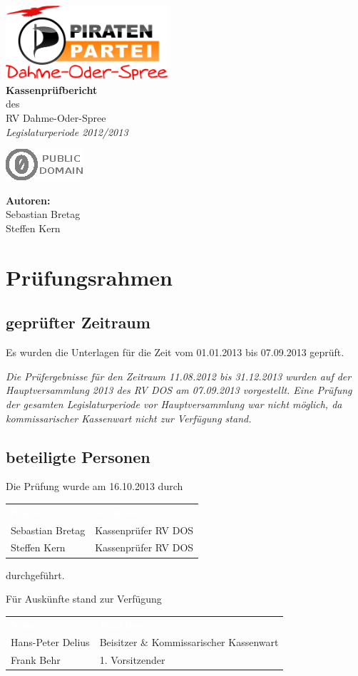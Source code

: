 \documentclass[%
	titlepage,oneside,12pt,headlines=1.5,numbers=noenddot, chapterprefix=false,parskip=full-,DIV=14,pagesize]{scrreprt}
\makeatletter
\newcommand*\@lizenz{
		\includegraphics[scale=2.5]{./pd.eps}
	}
\renewcommand\maketitle{
	\begingroup
		\begin{titlepage}
			\begin{center}
					\includegraphics[width=6cm]{DOS-Logo.png}\\[4cm]
				{\bfseries
					\makeatletter
						\Huge Kassenprüfbericht
					\makeatother
				}\\[5mm]
				\makeatletter
					{\Large des}\\[5mm]
					{\Large RV Dahme-Oder-Spree}\\[50mm]
					\textit{\Large Legislaturperiode 2012/2013 }
				\makeatother
					
			\end{center}
    		\vspace*{\fill} 
    		\begin{minipage}[b]{8cm}
    		\begin{flushleft}
    			\makeatletter
    				\@lizenz
    			\makeatother
    		\end{flushleft}
    	\end{minipage}
    		\hfill
    		\begin{minipage}[b]{8cm} 
    			\begin{flushright}
    				\textbf{Autoren:}\\[2mm]
    				Sebastian Bretag\\
    				Steffen Kern
    			\end{flushright}
    		\end{minipage}
    	\end{titlepage}
	\endgroup
	\pagebreak
	\pagestyle{plain}
	\onehalfspacing 
	\pagenumbering{arabic}
	\setcounter{page}{1}
	\tableofcontents
	\pagebreak
}
\renewcommand{\arraystretch}{1.2}%
\makeatother
\begin{document}
 
\maketitle

\chapter{Prüfungsrahmen}
\section{geprüfter Zeitraum}
Es wurden die Unterlagen für die Zeit vom 01.01.2013 bis 07.09.2013 geprüft.

\textit{Die Prüfergebnisse für den Zeitraum 11.08.2012 bis 31.12.2013 wurden auf der Hauptversammlung 2013 des RV DOS am 07.09.2013 vorgestellt. Eine Prüfung der gesamten Legislaturperiode vor Hauptversammlung war nicht möglich, da kommissarischer Kassenwart nicht zur Verfügung stand.}
\section{beteiligte Personen}
Die Prüfung wurde am 16.10.2013 durch
\renewcommand{\arraystretch}{1.2}%
\setlength{\arrayrulewidth}{1.5pt}%
%
\begin{longtable}[ht]{|p{} p{}|}
\hline\rowcolor{pirateorange} 
	\textcolor{white}{\textbf{Name}} & \textcolor{white}{\textbf{Funktion}}  \\
        Sebastian Bretag & Kassenprüfer RV DOS \\ 
        Steffen Kern  & Kassenprüfer RV DOS  \\
\hline
\end{longtable}\vspace{-1.25em}
durchgeführt.

Für Auskünfte stand zur Verfügung
\renewcommand{\arraystretch}{1.2}%
\setlength{\arrayrulewidth}{1.5pt}%
%
\begin{longtable}[ht]{|p{} p{}|}
\hline\rowcolor{pirateorange} 
	\textcolor{white}{\textbf{Name}} & \textcolor{white}{\textbf{Funktion}}  \\
        Hans-Peter Delius & Beisitzer \& Kommissarischer Kassenwart  \\ 
        Frank Behr & 1. Vorsitzender \\\hline
\end{longtable}\vspace{-1.25em}
\end{document}
